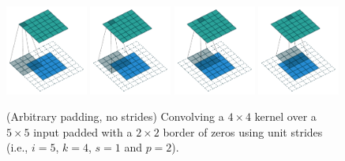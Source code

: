 \documentclass[notitlepage]{report}
\begin{document}
\begin{figure}[p]
    \centering
    \includegraphics[width=0.24\textwidth]{pdf/arbitrary_padding_no_strides_00.pdf}
    \includegraphics[width=0.24\textwidth]{pdf/arbitrary_padding_no_strides_01.pdf}
    \includegraphics[width=0.24\textwidth]{pdf/arbitrary_padding_no_strides_02.pdf}
    \includegraphics[width=0.24\textwidth]{pdf/arbitrary_padding_no_strides_03.pdf}
    \caption{\label{fig:arbitrary_padding_no_strides} (Arbitrary padding, no
        strides) Convolving a $4 \times 4$ kernel over a $5 \times 5$ input
        padded with a $2 \times 2$ border of zeros using unit strides (i.e.,
        $i = 5$, $k = 4$, $s = 1$ and $p = 2$).}
\end{figure}
\end{document}
